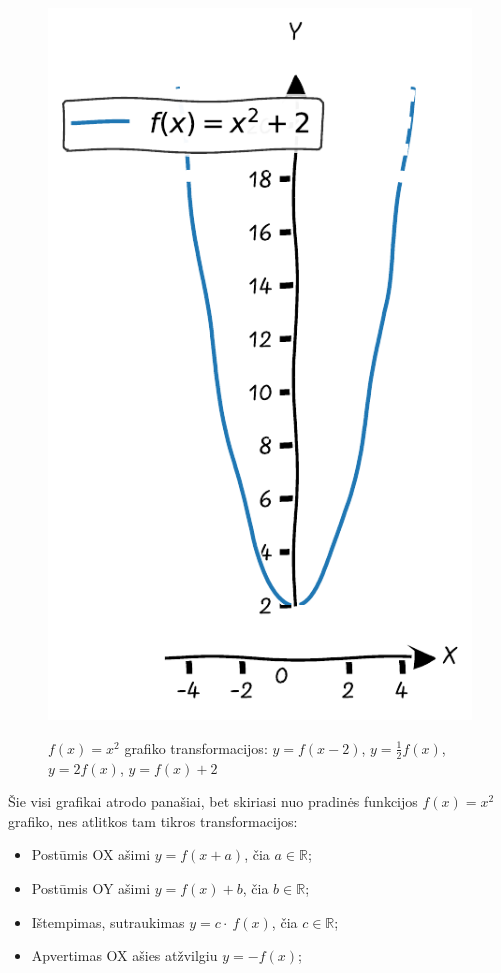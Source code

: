 \documentclass{tufte-handout}
\begin{document}
\begin{figure}[h]
\begin{minipage}{0.21\textwidth}
    \includegraphics[width=\linewidth]{./graphs/quadratic_func_ush_2.pdf}
    \label{fig:fourth}
  \end{minipage}
  \caption{$f(x)=x^2$ grafiko transformacijos: $y=f(x-2)$, $y=\frac{1}{2}f(x)$,
    $y=2f(x)$, $y=f(x)+2$ }
\end{figure}

Šie visi grafikai atrodo panašiai, bet skiriasi nuo pradinės funkcijos
$f(x)=x^2$ grafiko, nes atlitkos tam tikros transformacijos:

\begin{itemize}
  \item Postūmis OX ašimi $y=f(x+a)$, čia $a \in \mathbb{R}$;
  \item Postūmis OY ašimi $y=f(x)+b$, čia $b \in \mathbb{R}$;
  \item Ištempimas, sutraukimas $y=c \cdot\ f(x)$, čia $c \in \mathbb{R}$;
  \item Apvertimas OX ašies atžvilgiu $y=-f(x)$;
\end{itemize}
\end{document}
